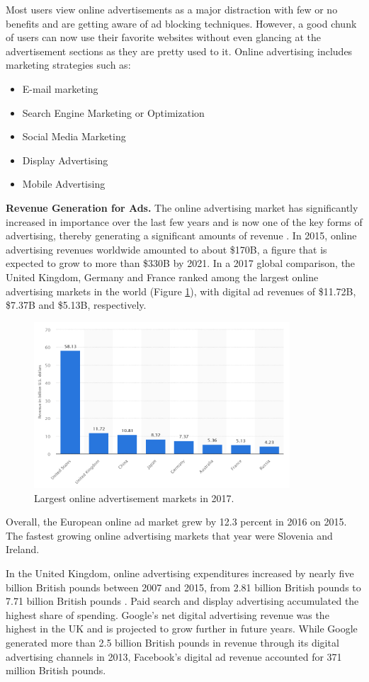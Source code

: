 \documentclass[runningheads,a4paper]{llncs}
\begin{document}
Most users view online advertisements as a major distraction with few or no benefits and are getting aware of ad blocking techniques. However, a good chunk of users can now use their favorite websites without even glancing at the advertisement sections as they are pretty used to it.
Online advertising includes marketing strategies such as:
\begin{itemize}
	\item E-mail marketing
    \item Search Engine Marketing or Optimization
    \item Social Media Marketing
    \item Display Advertising
    \item Mobile Advertising
\end{itemize}

\textbf{Revenue Generation for Ads.} The online advertising market has significantly increased in importance over the last few years and is now one of the key forms of advertising, thereby generating a significant amounts of revenue \cite{europe2017}. In 2015, online advertising revenues worldwide amounted to about \$170B, a figure that is expected to grow to more than \$330B by 2021. In a 2017 global comparison, the United Kingdom, Germany and France ranked among the largest online advertising markets in the world (Figure \ref{fig:largestOnline2017}), with digital ad revenues of \$11.72B, \$7.37B and \$5.13B, respectively.
\begin{figure}
\centering
\includegraphics[height=6.2cm]{largestOnline2017}
\caption{Largest online advertisement markets in 2017. \cite{largest2017}}
\label{fig:largestOnline2017}
\end{figure}
Overall, the European online ad market grew by 12.3 percent in 2016 on 2015. The fastest growing online advertising markets that year were Slovenia and Ireland. 

In the United Kingdom, online advertising expenditures increased by nearly five billion British pounds between 2007 and 2015, from 2.81 billion British pounds to 7.71 billion British pounds \cite{europe2017}. Paid search and display advertising accumulated the highest share of spending. Google's net digital advertising revenue was the highest in the UK and is projected to grow further in future years. While Google generated more than 2.5 billion British pounds in revenue through its digital advertising channels in 2013, Facebook’s digital ad revenue accounted for 371 million British pounds.
\end{document}
